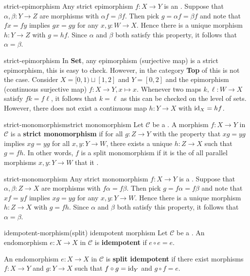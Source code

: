 \begin{example}{strict-epimorphism}
    Any strict epimorphism $f : X \to Y$ is an . Suppose that $\alpha, \beta : Y \to Z$ are morphisms with $\alpha f = \beta f$. Then pick $g = \alpha f = \beta f$ and note that $fx = fy$ implies $gx = gy$ for any $x, y : W \to X$. Hence there is a unique morphism $h : Y \to Z$ with $g = hf$. Since $\alpha$ and $\beta$ both satisfy this property, it follows that $\alpha = \beta$.
\end{example}

\begin{example}{strict-epimorphism}
    In \textbf{Set}, any epimorphism (surjective map) is a strict epimorphism, this is easy to check. However, in the category \textbf{Top} of  this is not the case. Consider $X = [0, 1) \sqcup [1, 2]$ and $Y = [0, 2]$ and the epimorphism (continuous surjective map) $f : X \to Y, x \mapsto x$. Whenever two maps $k, \ell : W \to X$ satisfy $fk = f\ell$, it follows that $k = \ell$ as this can be checked on the level of sets. However, there does not exist a continuous map $h : Y \to X$ with $\textup{id}_X = hf$.
\end{example}

\begin{topic}{strict-monomorphism}{strict monomorphism}
    Let $\mathcal{C}$ be a . A morphism $f : X \to Y$ in $\mathcal{C}$ is a \textbf{strict monomorphism} if for all $g : Z \to Y$ with the property that $xg = yg$ implies $xg = yg$ for all $x, y : Y \to W$, there exists a unique $h : Z \to X$ such that $g = fh$. In other words, $f$ is a split monomorphism if it is the  of all parallel morphisms $x, y : Y \to W$ that it .
\end{topic}

\begin{example}{strict-monomorphism}
    Any strict monomorphism $f : X \to Y$ is a . Suppose that $\alpha, \beta : Z \to X$ are morphisms with $f \alpha = f \beta$. Then pick $g = f \alpha = f \beta$ and note that $xf = yf$ implies $xg = yg$ for any $x, y : Y \to W$. Hence there is a unique morphism $h : Z \to X$ with $g = fh$. Since $\alpha$ and $\beta$ both satisfy this property, it follows that $\alpha = \beta$.
\end{example}

\begin{topic}{idempotent-morphism}{(split) idempotent morphism}
    Let $\mathcal{C}$ be a . An endomorphism $e : X \to X$ in $\mathcal{C}$ is \textbf{idempotent} if $e \circ e = e$.
    
    An endomorphism $e : X \to X$ in $\mathcal{C}$ is \textbf{split idempotent} if there exist morphisms $f : X \to Y$ and $g : Y \to X$ such that $f \circ g = \textup{id}_Y$ and $g \circ f = e$.
\end{topic}

